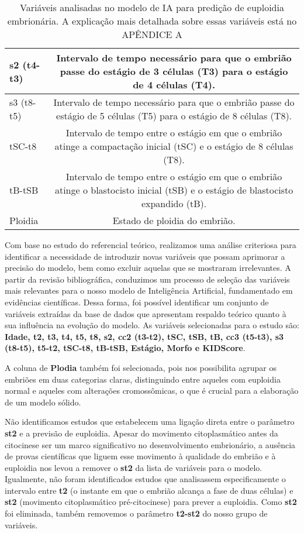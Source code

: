 \begin{table}[ht]
\begin{tabular}{|l|c|}
  s2 (t4-t3) & Intervalo de tempo necessário para que o embrião passe do estágio de 3 células (T3) para o estágio de 4 células (T4). \\ \hline
  s3 (t8-t5) & Intervalo de tempo necessário para que o embrião passe do estágio de 5 células (T5) para o estágio de 8 células (T8). \\ \hline
  tSC-t8 & Intervalo de tempo entre o estágio em que o embrião atinge a compactação inicial (tSC) e o estágio de 8 células (T8). \\ \hline
  tB-tSB & Intervalo de tempo entre o estágio em que o embrião atinge o blastocisto inicial (tSB) e o estágio de blastocisto expandido (tB). \\ \hline
  Ploidia & Estado de ploidia do embrião. \\ \hline
  \end{tabular}
  \caption{Variáveis analisadas no modelo de IA para predição de euploidia embrionária. A explicação mais detalhada sobre essas variáveis está no APÊNDICE A}
  \label{tab:definicoes_variaveis}
\end{table}

Com base no estudo do referencial teórico, realizamos uma análise criteriosa para identificar a necessidade de introduzir novas variáveis que possam aprimorar a precisão do modelo, bem como excluir aquelas que se mostraram irrelevantes. A partir da revisão bibliográfica, conduzimos um processo de seleção das variáveis mais relevantes para o nosso modelo de Inteligência Artificial, fundamentado em evidências científicas. Dessa forma, foi possível identificar um conjunto de variáveis extraídas da base de dados que apresentam respaldo teórico quanto à sua influência na evolução do modelo. As variáveis selecionadas para o estudo são: \textbf{Idade, t2, t3, t4, t5, t8, s2, cc2 (t3-t2), tSC, tSB, tB, cc3 (t5-t3), s3 (t8-t5), t5-t2, tSC-t8, tB-tSB, Estágio, Morfo e KIDScore}.

A coluna de \textbf{Plodia} também foi selecionada, pois nos possibilita agrupar os embriões em duas categorias claras, distinguindo entre aqueles com euploidia normal e aqueles com alterações cromossômicas, o que é crucial para a elaboração de um modelo sólido.

Não identificamos estudos que estabelecem uma ligação direta entre o parâmetro \textbf{st2} e a previsão de euploidia. Apesar do movimento citoplasmático antes da citocinese ser um marco significativo no desenvolvimento embrionário, a ausência de provas científicas que liguem esse movimento à qualidade do embrião e à euploidia nos levou a remover o \textbf{st2} da lista de variáveis para o modelo. Igualmente, não foram identificados estudos que analisassem especificamente o intervalo entre \textbf{t2} (o instante em que o embrião alcança a fase de duas células) e \textbf{st2} (movimento citoplasmático pré-citocinese) para prever a euploidia. Como \textbf{st2} foi eliminada, também removemos o parâmetro \textbf{t2-st2} do nosso grupo de variáveis.

